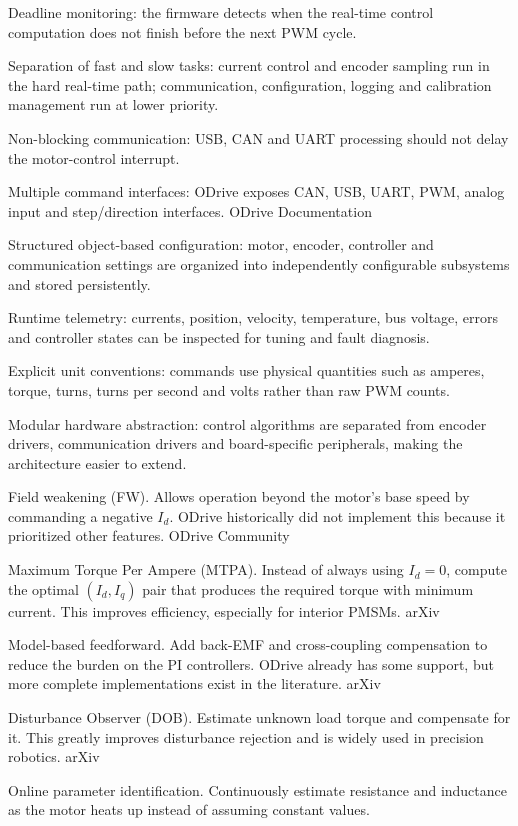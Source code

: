 {	Deadline monitoring: the firmware detects when the real-time control computation does not finish before the next PWM cycle.

	Separation of fast and slow tasks: current control and encoder sampling run in the hard real-time path; communication, configuration, logging and calibration management run at lower priority.

	Non-blocking communication: USB, CAN and UART processing should not delay the motor-control interrupt.

	Multiple command interfaces: ODrive exposes CAN, USB, UART, PWM, analog input and step/direction interfaces. ODrive Documentation

	Structured object-based configuration: motor, encoder, controller and communication settings are organized into independently configurable subsystems and stored persistently.

	Runtime telemetry: currents, position, velocity, temperature, bus voltage, errors and controller states can be inspected for tuning and fault diagnosis.

	Explicit unit conventions: commands use physical quantities such as amperes, torque, turns, turns per second and volts rather than raw PWM counts.

	Modular hardware abstraction: control algorithms are separated from encoder drivers, communication drivers and board-specific peripherals, making the architecture easier to extend.

	Field weakening (FW). Allows operation beyond the motor's base speed by commanding a negative \(I_d\). ODrive historically did not implement this because it prioritized other features. ODrive Community

	Maximum Torque Per Ampere (MTPA). Instead of always using \(I_d=0\), compute the optimal \((I_d,I_q)\) pair that produces the required torque with minimum current. This improves efficiency, especially for interior PMSMs. arXiv

	Model-based feedforward. Add back-EMF and cross-coupling compensation to reduce the burden on the PI controllers. ODrive already has some support, but more complete implementations exist in the literature. arXiv

	Disturbance Observer (DOB). Estimate unknown load torque and compensate for it. This greatly improves disturbance rejection and is widely used in precision robotics. arXiv

	Online parameter identification. Continuously estimate resistance and inductance as the motor heats up instead of assuming constant values.

}
